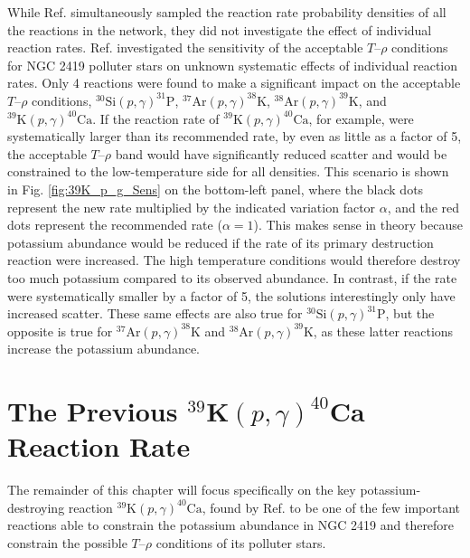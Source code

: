 While Ref. \cite{Iliadis2016} simultaneously sampled the reaction rate probability densities of all the reactions in the network, they did not investigate the effect of individual reaction rates. Ref. \cite{Dermigny2017} investigated the sensitivity of the acceptable $T$--$\rho$ conditions for NGC 2419 polluter stars on unknown systematic effects of individual reaction rates. Only 4 reactions were found to make a significant impact on the acceptable $T$--$\rho$ conditions, $^{30}\mathrm{Si}(p,\gamma)^{31}\mathrm{P}$, $^{37}\mathrm{Ar}(p,\gamma)^{38}\mathrm{K}$, $^{38}\mathrm{Ar}(p,\gamma)^{39}\mathrm{K}$, and $^{39}\mathrm{K}(p,\gamma)^{40}\mathrm{Ca}$. If the reaction rate of $^{39}\mathrm{K}(p,\gamma)^{40}\mathrm{Ca}$, for example, were systematically larger than its recommended rate, by even as little as a factor of 5, the acceptable $T$--$\rho$ band would have significantly reduced scatter and would be constrained to the low-temperature side for all densities. This scenario is shown in Fig. \ref{fig:39K_p_g_Sens} on the bottom-left panel, where the black dots represent the new rate multiplied by the indicated variation factor $\alpha$, and the red dots represent the recommended rate ($\alpha = 1$). This makes sense in theory because potassium abundance would be reduced if the rate of its primary destruction reaction were increased. The high temperature conditions would therefore destroy too much potassium compared to its observed abundance. In contrast, if the rate were systematically smaller by a factor of 5, the solutions interestingly only have increased scatter. These same effects are also true for $^{30}\mathrm{Si}(p,\gamma)^{31}\mathrm{P}$, but the opposite is true for $^{37}\mathrm{Ar}(p,\gamma)^{38}\mathrm{K}$ and $^{38}\mathrm{Ar}(p,\gamma)^{39}\mathrm{K}$, as these latter reactions increase the potassium abundance.

\section{The Previous $^{39}\mathrm{\textbf{K}}(p,\gamma)^{40}\mathrm{\textbf{Ca}}$ Reaction Rate} \label{sec:prev_39K_p_g_rate}

The remainder of this chapter will focus specifically on the key potassium-destroying reaction $^{39}\mathrm{K}(p,\gamma)^{40}\mathrm{Ca}$, found by Ref. \cite{Dermigny2017} to be one of the few important reactions able to constrain the potassium abundance in NGC 2419 and therefore constrain the possible $T$--$\rho$ conditions of its polluter stars. 

